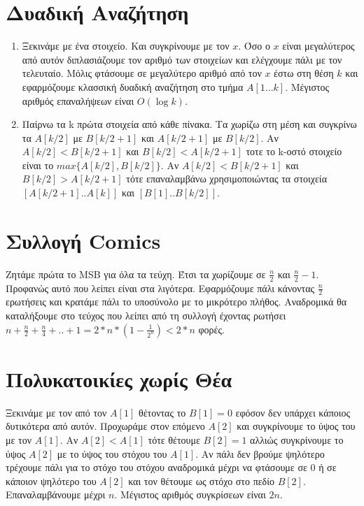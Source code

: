 \documentclass[a4paper,10pt]{article} \usepackage{anysize}
\begin{document}
\section{Δυαδική Αναζήτηση}
\begin{enumerate}
\item Ξεκινάμε με ένα στοιχείο. Και συγκρίνουμε με τον $x$. Όσο ο $x$ είναι
μεγαλύτερος από αυτόν διπλασιάζουμε τον αριθμό των στοιχείων και ελέγχουμε
πάλι με τον τελευταίο. Μόλις φτάσουμε σε μεγαλύτερο αριθμό από τον $x$ έστω
στη θέση $k$ και εφαρμόζουμε κλασσική δυαδική αναζήτηση στο τμήμα $A[1...k]$.
Μέγιστος αριθμός επαναλήψεων είναι $O(\log{k})$.
\item Παίρνω τα k πρώτα στοιχεία από κάθε πίνακα. Τα χωρίζω στη μέση και
συγκρίνω τα $A[k/2]$ με $B[k/2+1]$ και $A[k/2+1]$ με $B[k/2]$. Αν
$A[k/2]<B[k/2+1]$ και $B[k/2]<A[k/2+1]$ τοτε το k-οστό στοιχείο είναι το
$max\{A[k/2],B[k/2]\}$. Αν $A[k/2]<B[k/2+1]$ και $B[k/2]>A[k/2+1]$ τότε
επαναλαμβάνω χρησιμοποιώντας τα στοιχεία $[A[k/2+1]..A[k]]$ και
$[B[1]..B[k/2]]$.
\end{enumerate}
\section{Συλλογή Comics}
Ζητάμε πρώτα το MSB για όλα τα τεύχη. Έτσι τα χωρίζουμε σε $\frac{n}{2}$ και
$\frac{n}{2}-1$. Προφανώς αυτό που λείπει είναι στα λιγότερα. Εφαρμόζουμε πάλι
κάνοντας $\frac{n}{2}$ ερωτήσεις και κρατάμε πάλι το υποσύνολο με το μικρότερο
πλήθος. Αναδρομικά θα καταλήξουμε στο τεύχος που λείπει από τη συλλογή έχοντας
ρωτήσει $n+\frac{n}{2}+\frac{n}{4}+..+1=2*n*(1-\frac{1}{2^n}) < 2*n$ φορές.
\section{Πολυκατοικίες χωρίς Θέα}
Ξεκινάμε με τον από τον $A[1]$ θέτοντας το $B[1]=0$ εφόσον δεν υπάρχει κάποιος
δυτικότερα από αυτόν. Προχωράμε στον επόμενο $A[2]$ και συγκρίνουμε το ύψος
του με τον $A[1]$. Αν $A[2]<A[1]$ τότε θέτουμε $B[2]=1$ αλλιώς συγκρίνουμε το
ύψος $A[2]$ με το ύψος του στόχου του $A[1]$. Αν πάλι δεν βρούμε ψηλότερο
τρέχουμε πάλι για το στόχο του στόχου αναδρομικά μέχρι να φτάσουμε σε 0
ή σε κάποιον ψηλότερο του $A[2]$ και τον θέτουμε ως στόχο στο πεδίο $B[2]$.
Επαναλαμβάνουμε μέχρι $n$. Μέγιστος αριθμός συγκρίσεων είναι $2n$.
\end{document}
